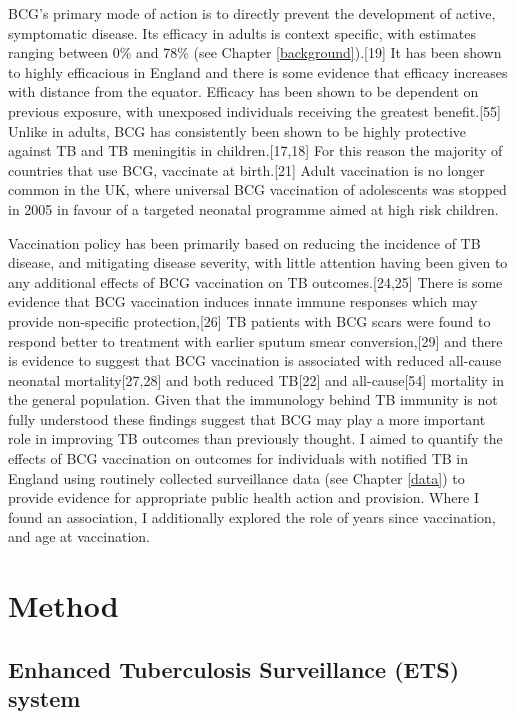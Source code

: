 \documentclass[11pt,twoside]{bristolthesis}
\begin{document}
  BCG's primary mode of action is to directly prevent the development of active, symptomatic disease. Its efficacy in adults is context specific, with estimates ranging between 0\% and 78\% (see Chapter \ref{background}).{[}19{]} It has been shown to highly efficacious in England and there is some evidence that efficacy increases with distance from the equator. Efficacy has been shown to be dependent on previous exposure, with unexposed individuals receiving the greatest benefit.{[}55{]} Unlike in adults, BCG has consistently been shown to be highly protective against TB and TB meningitis in children.{[}17,18{]} For this reason the majority of countries that use BCG, vaccinate at birth.{[}21{]} Adult vaccination is no longer common in the UK, where universal BCG vaccination of adolescents was stopped in 2005 in favour of a targeted neonatal programme aimed at high risk children.
  
  Vaccination policy has been primarily based on reducing the incidence of TB disease, and mitigating disease severity, with little attention having been given to any additional effects of BCG vaccination on TB outcomes.{[}24,25{]} There is some evidence that BCG vaccination induces innate immune responses which may provide non-specific protection,{[}26{]} TB patients with BCG scars were found to respond better to treatment with earlier sputum smear conversion,{[}29{]} and there is evidence to suggest that BCG vaccination is associated with reduced all-cause neonatal mortality{[}27,28{]} and both reduced TB{[}22{]} and all-cause{[}54{]} mortality in the general population. Given that the immunology behind TB immunity is not fully understood these findings suggest that BCG may play a more important role in improving TB outcomes than previously thought. I aimed to quantify the effects of BCG vaccination on outcomes for individuals with notified TB in England using routinely collected surveillance data (see Chapter \ref{data}) to provide evidence for appropriate public health action and provision. Where I found an association, I additionally explored the role of years since vaccination, and age at vaccination.
  
  \hypertarget{method-3}{%
  \section{Method}\label{method-3}}
  
  \hypertarget{enhanced-tuberculosis-surveillance-ets-system}{%
  \subsection{Enhanced Tuberculosis Surveillance (ETS) system}\label{enhanced-tuberculosis-surveillance-ets-system}}
  
\end{document}
